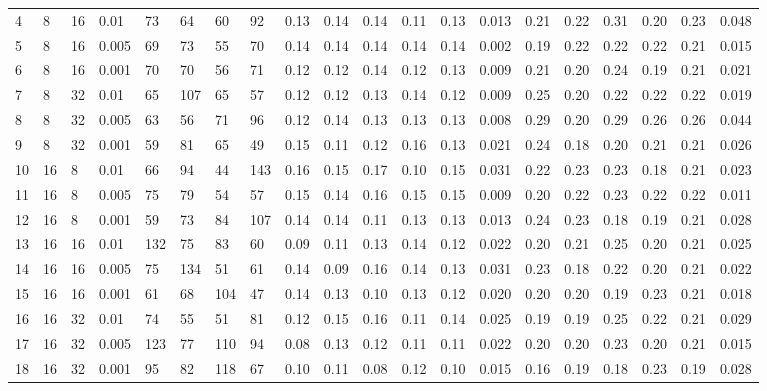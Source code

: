 \begin{landscape}
\begin{longtable}{llllllllllllllllllll}
4  & 8  & 16 & 0.01  & 73  & 64  & 60  & 92  & 0.13 & 0.14 & 0.14 & 0.11 & 0.13 & 0.013 & 0.21 & 0.22 & 0.31 & 0.20 & 0.23 & 0.048 \\
5  & 8  & 16 & 0.005 & 69  & 73  & 55  & 70  & 0.14 & 0.14 & 0.14 & 0.14 & 0.14 & 0.002 & 0.19 & 0.22 & 0.22 & 0.22 & 0.21 & 0.015 \\
6  & 8  & 16 & 0.001 & 70  & 70  & 56  & 71  & 0.12 & 0.12 & 0.14 & 0.12 & 0.13 & 0.009 & 0.21 & 0.20 & 0.24 & 0.19 & 0.21 & 0.021 \\
7  & 8  & 32 & 0.01  & 65  & 107 & 65  & 57  & 0.12 & 0.12 & 0.13 & 0.14 & 0.12 & 0.009 & 0.25 & 0.20 & 0.22 & 0.22 & 0.22 & 0.019 \\
8  & 8  & 32 & 0.005 & 63  & 56  & 71  & 96  & 0.12 & 0.14 & 0.13 & 0.13 & 0.13 & 0.008 & 0.29 & 0.20 & 0.29 & 0.26 & 0.26 & 0.044 \\
9  & 8  & 32 & 0.001 & 59  & 81  & 65  & 49  & 0.15 & 0.11 & 0.12 & 0.16 & 0.13 & 0.021 & 0.24 & 0.18 & 0.20 & 0.21 & 0.21 & 0.026 \\
10 & 16 & 8  & 0.01  & 66  & 94  & 44  & 143 & 0.16 & 0.15 & 0.17 & 0.10 & 0.15 & 0.031 & 0.22 & 0.23 & 0.23 & 0.18 & 0.21 & 0.023 \\
11 & 16 & 8  & 0.005 & 75  & 79  & 54  & 57  & 0.15 & 0.14 & 0.16 & 0.15 & 0.15 & 0.009 & 0.20 & 0.22 & 0.23 & 0.22 & 0.22 & 0.011 \\
12 & 16 & 8  & 0.001 & 59  & 73  & 84  & 107 & 0.14 & 0.14 & 0.11 & 0.13 & 0.13 & 0.013 & 0.24 & 0.23 & 0.18 & 0.19 & 0.21 & 0.028 \\
13 & 16 & 16 & 0.01  & 132 & 75  & 83  & 60  & 0.09 & 0.11 & 0.13 & 0.14 & 0.12 & 0.022 & 0.20 & 0.21 & 0.25 & 0.20 & 0.21 & 0.025 \\
14 & 16 & 16 & 0.005 & 75  & 134 & 51  & 61  & 0.14 & 0.09 & 0.16 & 0.14 & 0.13 & 0.031 & 0.23 & 0.18 & 0.22 & 0.20 & 0.21 & 0.022 \\
15 & 16 & 16 & 0.001 & 61  & 68  & 104 & 47  & 0.14 & 0.13 & 0.10 & 0.13 & 0.12 & 0.020 & 0.20 & 0.20 & 0.19 & 0.23 & 0.21 & 0.018 \\
16 & 16 & 32 & 0.01  & 74  & 55  & 51  & 81  & 0.12 & 0.15 & 0.16 & 0.11 & 0.14 & 0.025 & 0.19 & 0.19 & 0.25 & 0.22 & 0.21 & 0.029 \\
17 & 16 & 32 & 0.005 & 123 & 77  & 110 & 94  & 0.08 & 0.13 & 0.12 & 0.11 & 0.11 & 0.022 & 0.20 & 0.20 & 0.23 & 0.20 & 0.21 & 0.015 \\
18 & 16 & 32 & 0.001 & 95  & 82  & 118 & 67  & 0.10 & 0.11 & 0.08 & 0.12 & 0.10 & 0.015 & 0.16 & 0.19 & 0.18 & 0.23 & 0.19 & 0.028 \\

\end{longtable}
\end{landscape}
